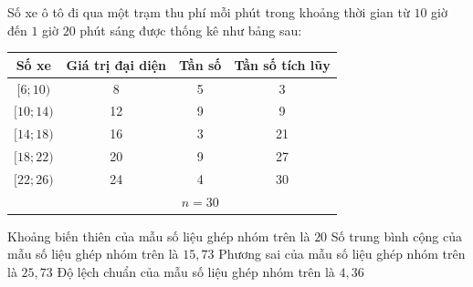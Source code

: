 \begin{ex}%

	Số xe ô tô đi qua một trạm thu phí mỗi phút trong khoảng thời gian từ $10$ giờ đến $1$ giờ $20$ phút sáng được thống kê như bảng sau:
	\begin{center}
		\begin{tabular}{|c|c|c|c|}
			\hline Số xe & Giá trị đại diện & Tần số & Tần số tích lũy \\
			\hline$[6 ; 10)$ & 8 & 5 & 3 \\
			\hline$[10 ; 14)$ & 12 & 9 & 9 \\
			\hline$[14 ; 18)$ & 16 & 3 & 21 \\
			\hline$[18 ; 22)$ & 20 & 9 & 27 \\
			\hline$[22 ; 26)$ & 24 & 4 & 30 \\
			\hline & & $n=30$ & \\
			\hline	
		\end{tabular}
	\end{center}
	\choiceTF
	{\True Khoảng biến thiên của mẫu số liệu ghép nhóm trên là $20$}
	{\True Số trung bình cộng của mẫu số liệu ghép nhóm trên là $15{,}73$}
	{Phương sai của mẫu số liệu ghép nhóm trên là $25{,}73$}
	{Độ lệch chuẩn của mẫu số liệu ghép nhóm trên là $4{,}36$}
\end{ex}

